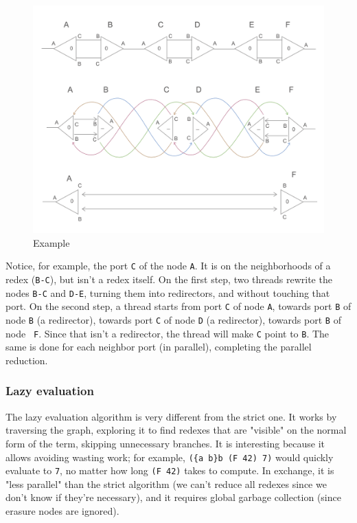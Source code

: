 \documentclass{article}
\theoremstyle{definition}
\theoremstyle{theorem}
\begin{document}
\begin{figure}[H]
  \includegraphics[width=\linewidth]{sk_local_rewrites_ex_2x.png}
  \caption{Example}
\end{figure}

Notice, for example, the port \verb|C| of the node \verb|A|. It is on the
neighborhoods of a redex (\verb|B-C|), but isn't a redex itself. On the first
step, two threads rewrite the nodes \verb|B-C| and \verb|D-E|, turning them into
redirectors, and without touching that port. On the second step, a thread starts
from port \verb|C| of node \verb|A|, towards port \verb|B| of node \verb|B| (a
redirector), towards port \verb|C| of node \verb|D| (a redirector), towards port
\verb|B| of node \verb| F|. Since that isn't a redirector, the thread will make
\verb|C| point to \verb|B|. The same is done for each neighbor port (in
parallel), completing the parallel reduction.

\subsubsection{Lazy evaluation}

The lazy evaluation algorithm is very different from the strict one. It works by
traversing the graph, exploring it to find redexes that are "visible" on the
normal form of the term, skipping unnecessary branches. It is interesting
because it allows avoiding wasting work; for example, \verb|({a b}b (F 42) 7)|
would quickly evaluate to \verb|7|, no matter how long \verb|(F 42)| takes to
compute. In exchange, it is "less parallel" than the strict algorithm (we can't
reduce all redexes since we don't know if they're necessary), and it requires
global garbage collection (since erasure nodes are ignored).
\end{document}
